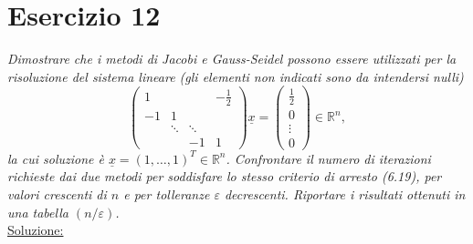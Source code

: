 \section{Esercizio 12}
\label{sub:es12}
\emph{Dimostrare che i metodi di Jacobi e Gauss-Seidel possono essere utilizzati per la risoluzione del sistema lineare (gli elementi non indicati sono da intendersi nulli)
			\[
				\begin{pmatrix}
					1 & & & -\frac{1}{2}\\
					-1 & 1 & &\\
					& \ddots & \ddots &\\
					& & -1 & 1
				\end{pmatrix}\underline{x}=\begin{pmatrix}
					\frac{1}{2}\\
					0\\
					\vdots\\
					0
				\end{pmatrix}\in\mathbb{R}^n,
			\]
			la cui soluzione è $\underline{x}=(1,\dots,1)^T\in\mathbb{R}^n$.
      Confrontare il numero di iterazioni richieste dai due metodi per soddisfare lo stesso criterio di arresto (6.19),
      per valori crescenti di $n$ e per tolleranze $\varepsilon$ decrescenti. Riportare i risultati ottenuti in una tabella $(n/\varepsilon)$.
      }\\
\underline{Soluzione:}

